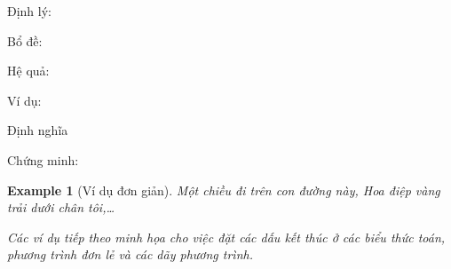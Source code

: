 \medskip 
Định lý:
\begin{command}
  \theoremstyle{marginbreak}
  \theoremheaderfont{\normalfont\bfseries}\theorembodyfont{\slshape}
  \theoremsymbol{\ensuremath{\diamondsuit}}
  \theoremseparator{:}
  \newtheorem{Theorem}{Theorem}\end{command}
Bổ đề:
\begin{command}
  \theoremstyle{changebreak}
  \theoremsymbol{\ensuremath{\heartsuit}}
  \newtheorem{Lemma}{Lemma}\end{command}
 Hệ quả:
\begin{command}
  \theoremsymbol{\ensuremath{\spadesuit}}
  \newtheorem{Corollary}[Theorem]{Corollary}\end{command}
Ví dụ:
\begin{command}
  \theoremstyle{change}
  \theorembodyfont{\upshape}
  \theoremsymbol{\ensuremath{\ast}}
  \theoremseparator{}
  \newtheorem{Example}{Example}\end{command}
 Định nghĩa
\begin{command}
  \theoremstyle{plain}
  \theoremsymbol{\ensuremath{\clubsuit}}
  \newtheorem{Definition}{Definition}\end{command}
Chứng minh:
\begin{command}
  \theoremheaderfont{\sc}\theorembodyfont{\upshape}
  \theoremstyle{nonumberplain}
  \theoremseparator{}
  \theoremsymbol{\rule{1ex}{1ex}}
  \newtheorem{Proof}{Proof}\end{command}

{\color{-red!75!green!50}
\begin{Example}[Ví dụ đơn giản]
Một chiều đi trên con đường này, Hoa điệp vàng trải dưới chân tôi,\ldots 

	Các ví dụ tiếp theo minh họa cho việc đặt các dấu kết thúc
	ở các biểu thức toán, phương trình đơn lẻ và các dãy phương trình.
\end{Example}
}


